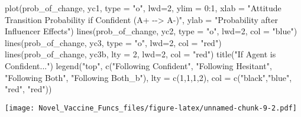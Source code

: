 \documentclass[
]{article}
\newenvironment{Shaded}{\begin{snugshade}}{\end{snugshade}}
\newcommand{\AttributeTok}[1]{\textcolor[rgb]{0.77,0.63,0.00}{#1}}
\newcommand{\DecValTok}[1]{\textcolor[rgb]{0.00,0.00,0.81}{#1}}
\newcommand{\FunctionTok}[1]{\textcolor[rgb]{0.00,0.00,0.00}{#1}}
\newcommand{\NormalTok}[1]{#1}
\newcommand{\SpecialCharTok}[1]{\textcolor[rgb]{0.00,0.00,0.00}{#1}}
\newcommand{\StringTok}[1]{\textcolor[rgb]{0.31,0.60,0.02}{#1}}
\begin{document}
\begin{Shaded}
\begin{Highlighting}[]
\FunctionTok{plot}\NormalTok{(prob\_of\_change, yc1, }\AttributeTok{type =} \StringTok{"o"}\NormalTok{, }\AttributeTok{lwd=}\DecValTok{2}\NormalTok{, }\AttributeTok{ylim =} \DecValTok{0}\SpecialCharTok{:}\DecValTok{1}\NormalTok{, }\AttributeTok{xlab =} \StringTok{"Attitude Transition Probability if Confident (A+ {-}{-}\textgreater{} A{-})"}\NormalTok{, }\AttributeTok{ylab =} \StringTok{"Probability after Influencer Effects"}\NormalTok{)}
\FunctionTok{lines}\NormalTok{(prob\_of\_change, yc2, }\AttributeTok{type =} \StringTok{"o"}\NormalTok{, }\AttributeTok{lwd=}\DecValTok{2}\NormalTok{, }\AttributeTok{col =} \StringTok{"blue"}\NormalTok{)}
\FunctionTok{lines}\NormalTok{(prob\_of\_change, yc3, }\AttributeTok{type =} \StringTok{"o"}\NormalTok{, }\AttributeTok{lwd=}\DecValTok{2}\NormalTok{, }\AttributeTok{col =} \StringTok{"red"}\NormalTok{)}
\FunctionTok{lines}\NormalTok{(prob\_of\_change, yc3b, }\AttributeTok{lty =} \DecValTok{2}\NormalTok{, }\AttributeTok{lwd=}\DecValTok{2}\NormalTok{, }\AttributeTok{col =} \StringTok{"red"}\NormalTok{)}
\FunctionTok{title}\NormalTok{(}\StringTok{"If Agent is Confident..."}\NormalTok{)}
\FunctionTok{legend}\NormalTok{(}\StringTok{"top"}\NormalTok{, }\FunctionTok{c}\NormalTok{(}\StringTok{"Following Confident"}\NormalTok{, }\StringTok{"Following Hesitant"}\NormalTok{, }\StringTok{"Following Both"}\NormalTok{, }\StringTok{"Following Both\_b"}\NormalTok{), }\AttributeTok{lty =} \FunctionTok{c}\NormalTok{(}\DecValTok{1}\NormalTok{,}\DecValTok{1}\NormalTok{,}\DecValTok{1}\NormalTok{,}\DecValTok{2}\NormalTok{), }\AttributeTok{col =} \FunctionTok{c}\NormalTok{(}\StringTok{"black"}\NormalTok{,}\StringTok{"blue"}\NormalTok{, }\StringTok{"red"}\NormalTok{, }\StringTok{"red"}\NormalTok{))}
\end{Highlighting}
\end{Shaded}

\texttt{[image: Novel\_Vaccine\_Funcs\_files/figure-latex/unnamed-chunk-9-2.pdf]}
\end{document}
